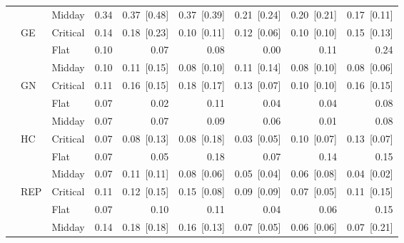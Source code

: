 \begin{tabular}{l l l r r r r r r }
 &  & Midday & 0.34 & 0.37~{\color{seasoncol}\scriptsize[0.48]} & 0.37~{\color{seasoncol}\scriptsize[0.39]} & 0.21~{\color{seasoncol}\scriptsize[0.24]} & 0.20~{\color{seasoncol}\scriptsize[0.21]} & 0.17~{\color{seasoncol}\scriptsize[0.11]} \\
 & GE & Critical & 0.14 & 0.18~{\color{seasoncol}\scriptsize[0.23]} & 0.10~{\color{seasoncol}\scriptsize[0.11]} & 0.12~{\color{seasoncol}\scriptsize[0.06]} & 0.10~{\color{seasoncol}\scriptsize[0.10]} & 0.15~{\color{seasoncol}\scriptsize[0.13]} \\
 &  & Flat & 0.10 & 0.07 & 0.08 & 0.00 & 0.11 & 0.24 \\
 &  & Midday & 0.10 & 0.11~{\color{seasoncol}\scriptsize[0.15]} & 0.08~{\color{seasoncol}\scriptsize[0.10]} & 0.11~{\color{seasoncol}\scriptsize[0.14]} & 0.08~{\color{seasoncol}\scriptsize[0.10]} & 0.08~{\color{seasoncol}\scriptsize[0.06]} \\
 & GN & Critical & 0.11 & 0.16~{\color{seasoncol}\scriptsize[0.15]} & 0.18~{\color{seasoncol}\scriptsize[0.17]} & 0.13~{\color{seasoncol}\scriptsize[0.07]} & 0.10~{\color{seasoncol}\scriptsize[0.10]} & 0.16~{\color{seasoncol}\scriptsize[0.15]} \\
 &  & Flat & 0.07 & 0.02 & 0.11 & 0.04 & 0.04 & 0.08 \\
 &  & Midday & 0.07 & 0.07 & 0.09 & 0.06 & 0.01 & 0.08 \\
 & HC & Critical & 0.07 & 0.08~{\color{seasoncol}\scriptsize[0.13]} & 0.08~{\color{seasoncol}\scriptsize[0.18]} & 0.03~{\color{seasoncol}\scriptsize[0.05]} & 0.10~{\color{seasoncol}\scriptsize[0.07]} & 0.13~{\color{seasoncol}\scriptsize[0.07]} \\
 &  & Flat & 0.07 & 0.05 & 0.18 & 0.07 & 0.14 & 0.15 \\
 &  & Midday & 0.07 & 0.11~{\color{seasoncol}\scriptsize[0.11]} & 0.08~{\color{seasoncol}\scriptsize[0.06]} & 0.05~{\color{seasoncol}\scriptsize[0.04]} & 0.06~{\color{seasoncol}\scriptsize[0.08]} & 0.04~{\color{seasoncol}\scriptsize[0.02]} \\
 & REP & Critical & 0.11 & 0.12~{\color{seasoncol}\scriptsize[0.15]} & 0.15~{\color{seasoncol}\scriptsize[0.08]} & 0.09~{\color{seasoncol}\scriptsize[0.09]} & 0.07~{\color{seasoncol}\scriptsize[0.05]} & 0.11~{\color{seasoncol}\scriptsize[0.15]} \\
 &  & Flat & 0.07 & 0.10 & 0.11 & 0.04 & 0.06 & 0.15 \\
 &  & Midday & 0.14 & 0.18~{\color{seasoncol}\scriptsize[0.18]} & 0.16~{\color{seasoncol}\scriptsize[0.13]} & 0.07~{\color{seasoncol}\scriptsize[0.05]} & 0.06~{\color{seasoncol}\scriptsize[0.06]} & 0.07~{\color{seasoncol}\scriptsize[0.21]} \\
\bottomrule
\end{tabular}